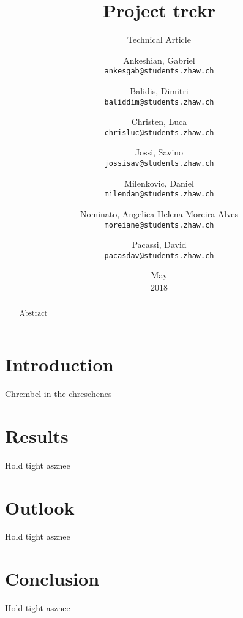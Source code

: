 \documentclass[a4paper, 12pt, headsepline]{scrartcl}
\title{Project trckr}
\subtitle{Technical Article}
\date{May \\ 2018}
\author{
    Ankeshian, Gabriel\\
    \texttt{ankesgab@students.zhaw.ch}
    \and
    Balidis, Dimitri\\
    \texttt{baliddim@students.zhaw.ch}
    \and
    Christen, Luca\\
    \texttt{chrisluc@students.zhaw.ch}
    \and
    Jossi, Savino\\
    \texttt{jossisav@students.zhaw.ch}
    \and
    Milenkovic, Daniel\\
    \texttt{milendan@students.zhaw.ch}
    \and
    Nominato, Angelica Helena Moreira Alves\\
    \texttt{moreiane@students.zhaw.ch}
    \and
    Pacassi, David\\
    \texttt{pacasdav@students.zhaw.ch}}
\begin{document}
\maketitle
\pagebreak

\begin{abstract}
    Abstract
\end{abstract}


\tableofcontents

\section{Introduction}
Chrembel in the chreschenes

\section{Results}
Hold tight asznee

\section{Outlook}
Hold tight asznee

\section{Conclusion}
Hold tight asznee
\end{document}
